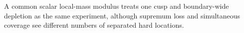 A common scalar local-mass modulus treats one cusp and boundary-wide depletion as the same experiment, although supremum loss and simultaneous coverage see different numbers of separated hard locations.